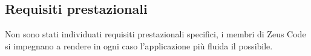 \subsection{Requisiti prestazionali}

%
%	
%	
%
Non sono stati individuati requisiti prestazionali specifici, i membri di Zeus Code si impegnano a rendere in ogni caso l'applicazione più fluida il possibile.
